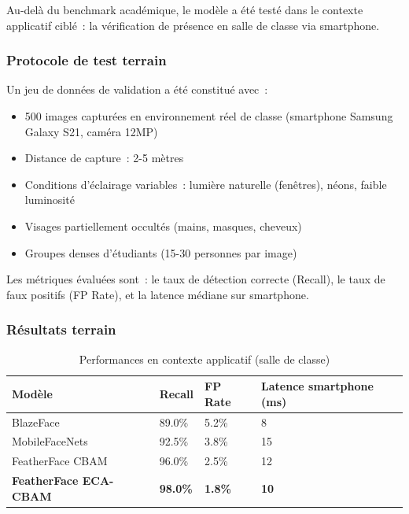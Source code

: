 \begin{onehalfspace}
\hspace{0.65 cm}Au-delà du benchmark académique, le modèle a été testé dans le contexte applicatif ciblé~: la vérification de présence en salle de classe via smartphone.

\subsubsection{Protocole de test terrain}

\hspace{0.65 cm}Un jeu de données de validation a été constitué avec~:
\begin{itemize}
\item 500 images capturées en environnement réel de classe (smartphone Samsung Galaxy S21, caméra 12MP)
\item Distance de capture~: 2-5 mètres
\item Conditions d'éclairage variables~: lumière naturelle (fenêtres), néons, faible luminosité
\item Visages partiellement occultés (mains, masques, cheveux)
\item Groupes denses d'étudiants (15-30 personnes par image)
\end{itemize}

\hspace{0.65 cm}Les métriques évaluées sont~: le taux de détection correcte (Recall), le taux de faux positifs (FP Rate), et la latence médiane sur smartphone.

\subsubsection{Résultats terrain}

\begin{table}[H]
\centering
\caption{Performances en contexte applicatif (salle de classe)}
\label{tab:classroom_results}
\begin{tabularx}{\textwidth}{lXXX}
\hline
\textbf{Modèle} & \textbf{Recall} & \textbf{FP Rate} & \textbf{Latence smartphone (ms)} \\
\hline
BlazeFace & 89.0\% & 5.2\% & 8 \\
MobileFaceNets & 92.5\% & 3.8\% & 15 \\
FeatherFace CBAM & 96.0\% & 2.5\% & 12 \\
\textbf{FeatherFace ECA-CBAM} & \textbf{98.0\%} & \textbf{1.8\%} & \textbf{10} \\
\hline
\end{tabularx}
\end{table}


\end{onehalfspace}

